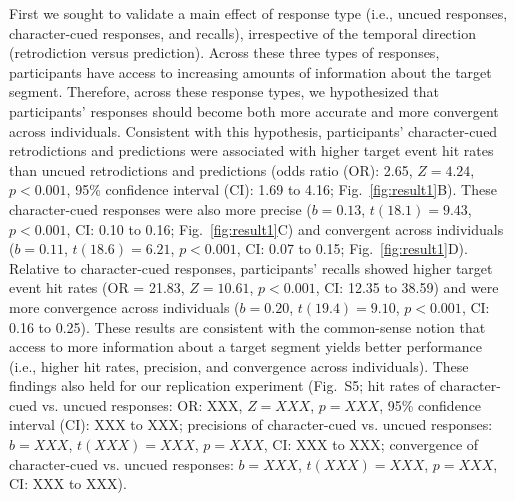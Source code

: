 \documentclass[10pt]{article}
\newcommand{\targetAsymmetries}{S5}
\begin{document}
First we sought to validate a main effect of response type (i.e., uncued responses, character-cued responses, and recalls), irrespective of the temporal direction (retrodiction versus prediction).  Across these three types of responses, participants have access to increasing amounts of information about the target segment.  Therefore, across these response types, we hypothesized that participants' responses should become both more accurate and more convergent across individuals.  Consistent with this hypothesis, participants' character-cued retrodictions and predictions were associated with higher target event hit rates than uncued retrodictions and predictions (odds ratio (OR): 2.65, $Z = 4.24$, $p < 0.001$, 95\% confidence interval (CI): 1.69 to 4.16; Fig.~\ref{fig:result1}B).  These character-cued responses were also more precise ($b = 0.13$, $t(18.1) = 9.43$, $p < 0.001$, CI: 0.10 to 0.16; Fig.~\ref{fig:result1}C) and convergent across individuals ($b = 0.11$, $t(18.6) = 6.21$, $p < 0.001$, CI: 0.07 to 0.15; Fig.~\ref{fig:result1}D).   Relative to character-cued responses, participants' recalls showed higher target event hit rates (OR = 21.83, $Z = 10.61$, $p < 0.001$, CI: 12.35 to 38.59) and were more convergence across individuals ($b = 0.20$, $t(19.4) = 9.10$, $p < 0.001$, CI: 0.16 to 0.25). These results are consistent with the common-sense notion that access to more information about a target segment yields better performance (i.e., higher hit rates, precision, and convergence across individuals).  These findings also held for our replication experiment (Fig.~\targetAsymmetries; hit rates of character-cued vs. uncued responses: OR: XXX, $Z = XXX$, $p = XXX$, 95\% confidence interval (CI): XXX to XXX; precisions of character-cued vs. uncued responses: $b = XXX$, $t(XXX) = XXX$, $p = XXX$, CI: XXX to XXX; convergence of character-cued vs. uncued responses: $b = XXX$, $t(XXX) = XXX$, $p = XXX$, CI: XXX to XXX).
\end{document}
